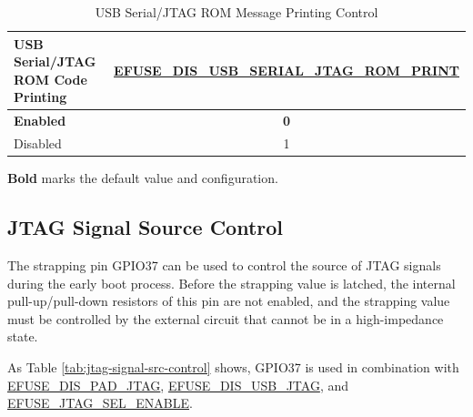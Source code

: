 \documentclass[main\_\_EN.tex]{subfiles}
\begin{document}
\begin{table}[H]
    \centering
    \caption{USB Serial/JTAG ROM Message Printing Control}
    \label{tab:usb-rom-msg-printing-control}

    \begin{threeparttable}

    \begin{tabular}{ | l | c |}
    \hline
    
    \rowcolor{lightgray}
    \textbf{USB Serial/JTAG ROM Code Printing} & \textbf{\hyperref[fielddesc:EFUSEDISUSBSERIALJTAGROMPRINT]{EFUSE\_DIS\_USB\_SERIAL\_JTAG\_ROM\_PRINT}} \\\hline

    \textbf{Enabled} & \textbf{0} \\\hline
    Disabled & 1 \\\hline
    
    \end{tabular}

        \begin{tablenotes}
            \item[1] \textbf{Bold} marks the default value and configuration.
        \end{tablenotes}
        
    \end{threeparttable}
\end{table}

\subsection{JTAG Signal Source Control}


The strapping pin GPIO37 can be used to control the source of JTAG signals during the early boot process. Before the strapping value is latched, the internal pull-up/pull-down resistors of this pin are not enabled, and the strapping value must be controlled by the external circuit that cannot be in a high-impedance state.

As Table \ref{tab:jtag-signal-src-control} \textit{} shows, GPIO37 is used in combination with \hyperref[fielddesc:EFUSEDISPADJTAG]{EFUSE\_DIS\_PAD\_JTAG}, \hyperref[fielddesc:EFUSEDISUSBJTAG]{EFUSE\_DIS\_USB\_JTAG}, and \hyperref[fielddesc:EFUSEJTAGSELENABLE]{EFUSE\_JTAG\_SEL\_ENABLE}.


\setlength\tabcolsep{2pt}
\end{document}
